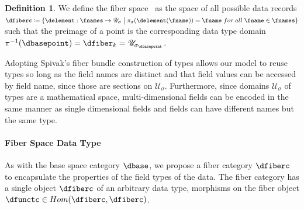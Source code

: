 \documentclass{vgtc}
\theoremstyle{definition}
\newtheorem{definition}{Definition}[section]
\theoremstyle{remark}
\begin{document}
\begin{definition}
  \label{def:fiber}
  We define the \textcolor{fiber}{fiber space} \dfiberc\ as the space of all possible data records $ \dfiberc \coloneqq \{\delement: \fnames \rightarrow \mathscr{U}_{\sigma} \bigm{\vert} \pi_{\sigma}(\delement(\fname)) = \fname\;for\;all\; \fname \in \fnames \}$ such that the preimage of a point is the corresponding data type domain $\pi^{-1}(\dbasepoint) = \dfiber_{k} = \mathscr{U}_{{\sigma}_{\dbasepoint}}$. 
\end{definition}

\noindent Adopting Spivak's fiber bundle construction of types allows our model to reuse types so long as the field names are distinct and that field values can be accessed by field name, since those are sections on $\mathcal{U}_{\sigma}$. Furthermore, since domains $\mathscr{U}_{{\sigma}}$ of types are a mathematical space, multi-dimensional fields can be encoded in the same manner as single dimensional fields and fields can have different names but the same type.

\paragraph{Fiber Space Data Type}
As with the base space category $\mathcal{\dbase}$, we propose a fiber category $\mathcal{\dfiberc}$ to encapsulate the properties of the field types of the data. The fiber category has a single object $\dfiberc$ of an arbitrary data type, morphisms on the fiber object $\dfunctc \in Hom(\dfiberc, \dfiberc)$.  
\end{document}
